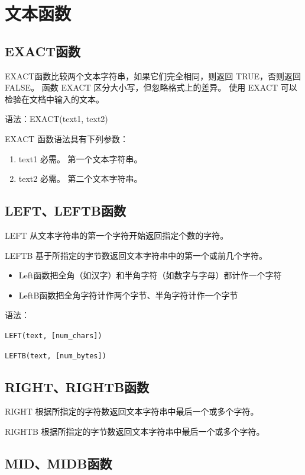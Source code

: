 \newpage
\section{文本函数}

\subsection{EXACT函数}

EXACT函数比较两个文本字符串，如果它们完全相同，则返回 TRUE，否则返回 FALSE。 函数 EXACT 区分大小写，但忽略格式上的差异。 使用 EXACT 可以检验在文档中输入的文本。

语法：EXACT(text1, text2)

EXACT 函数语法具有下列参数：
\begin{enumerate}
  \item text1    必需。 第一个文本字符串。
  \item text2    必需。 第二个文本字符串。
\end{enumerate}

\subsection{LEFT、LEFTB函数}

LEFT 从文本字符串的第一个字符开始返回指定个数的字符。

LEFTB 基于所指定的字节数返回文本字符串中的第一个或前几个字符。

\begin{itemize}
  \item Left函数把全角（如汉字）和半角字符（如数字与字母）都计作一个字符
  \item LeftB函数把全角字符计作两个字节、半角字符计作一个字节
\end{itemize}

语法：

\verb|LEFT(text, [num_chars])|

\verb|LEFTB(text, [num_bytes])|


\subsection{RIGHT、RIGHTB函数}

RIGHT 根据所指定的字符数返回文本字符串中最后一个或多个字符。

RIGHTB 根据所指定的字节数返回文本字符串中最后一个或多个字符。

\subsection{MID、MIDB函数}

